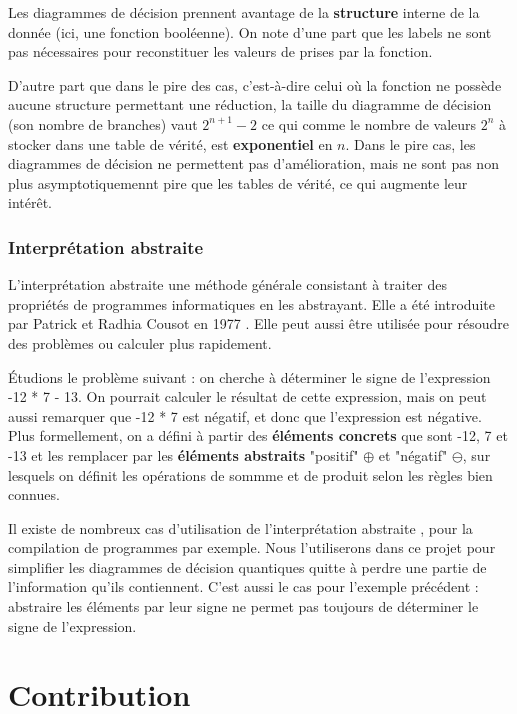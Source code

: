 Les diagrammes de décision prennent avantage de la \textbf{structure} interne de la donnée (ici, une fonction booléenne). On note d'une part que les labels ne sont pas nécessaires pour reconstituer les valeurs de prises par la fonction.

D'autre part que dans le pire des cas, c'est-à-dire celui où la fonction ne possède aucune structure permettant une réduction, la taille du diagramme de décision (son nombre de branches) vaut $2^{n+1} - 2$ ce qui comme le nombre de valeurs $2^n$ à stocker dans une table de vérité, est \textbf{exponentiel} en $n$. Dans le pire cas, les diagrammes de décision ne permettent pas d'amélioration, mais ne sont pas non plus asymptotiquemennt pire que les tables de vérité, ce qui augmente leur intérêt.

\subsubsection*{Interprétation abstraite}


L'interprétation abstraite une méthode générale consistant à traiter des propriétés de programmes informatiques en les abstrayant. Elle a été introduite par Patrick et Radhia Cousot en 1977 \cite{CousotCousot77-1}. Elle peut aussi être utilisée pour résoudre des problèmes ou calculer plus rapidement.

Étudions le problème suivant : on cherche à déterminer le signe de  l'expression -12 * 7 - 13. On pourrait calculer le résultat de cette expression, mais on peut aussi remarquer que -12 * 7 est négatif, et donc que l'expression est négative. Plus formellement, on a défini à partir des \textbf{éléments concrets} que sont -12, 7 et -13 et les remplacer par les \textbf{éléments abstraits} "positif" $\oplus$ et "négatif" $\ominus$, sur lesquels on définit les opérations de sommme et de produit selon les règles bien connues.

Il existe de nombreux cas d'utilisation de l'interprétation abstraite \cite{Rosendahl_1995}, pour la compilation de programmes par exemple. Nous l'utiliserons dans ce projet pour simplifier les diagrammes de décision quantiques quitte à perdre une partie de l'information qu'ils contiennent. C'est aussi le cas pour l'exemple précédent : abstraire les éléments par leur signe ne permet pas toujours de déterminer le signe de l'expression.


\section{Contribution}
\label{sec:Contribution}

